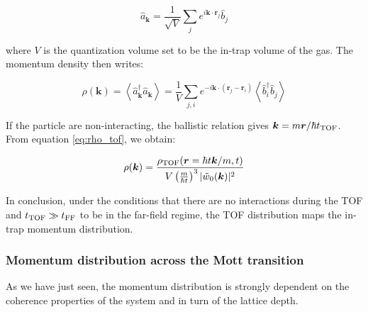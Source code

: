 \begin{equation}
    \hat{a}_{\bm{k}}=\frac{1}{\sqrt{V}} \sum_{j} e^{i \bm{k} \cdot \bm{r}_{j}} \hat{b}_{j}
\end{equation}

\noindent where $V$ is the quantization volume set to be the in-trap volume of the gas. The momentum density then writes:

\begin{equation}
    \rho(\bm{k})=\left\langle\hat{a}^{\dagger}_{\bm{k}} \hat{a}_{\bm{k}}\right\rangle=\frac{1}{V} \sum_{j, i} e^{-i \bm{k} \cdot\left(\bm{r}_{j}-\bm{r}_{i}\right)}\left\langle\hat{b}_{i}^{\dagger} \hat{b}_{j}\right\rangle
    \label{eq:momentum_distribution}
\end{equation}

\noindent If the particle are non-interacting, the ballistic relation gives $\bm{k} = m \bm{r}/\hbar t_{\rm{TOF}}$. From equation \ref{eq:rho_tof}, we obtain:

\begin{equation}
    \rho(\bm{k}) = \frac{\rho_{\rm{TOF}}(\bm{r}=\hbar t\bm{k}/m,t)}{V  \left(\frac{m}{\hbar t} \right)^3 |\tilde{w}_0(\bm{k})|^2}
\end{equation}

In conclusion, under the conditions that there are no interactions during the TOF and $t_{\rm{TOF}} \gg t_{\rm{FF}}$ to be in the far-field regime, the TOF distribution maps the in-trap momentum distribution. 

\subsubsection{Momentum distribution across the Mott transition}

As we have just seen, the momentum distribution is strongly dependent on the coherence properties of the system and in turn of the lattice depth.

